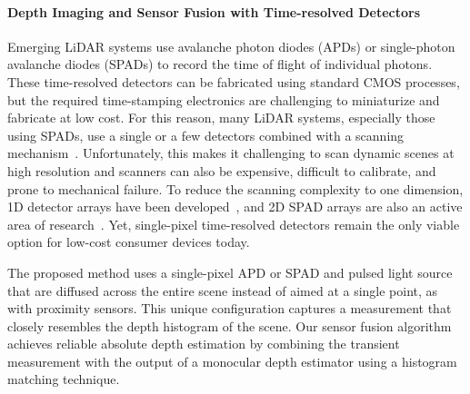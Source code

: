 \paragraph{Depth Imaging and Sensor Fusion with Time-resolved Detectors}
%
Emerging LiDAR systems use avalanche photon diodes (APDs) or single-photon avalanche diodes (SPADs)
to record the time of flight of individual photons. These time-resolved detectors can be
fabricated using standard CMOS processes, but the required time-stamping electronics are challenging to miniaturize and fabricate at low
cost. For this reason, many LiDAR systems, especially those using SPADs, use a single or a few detectors
combined with a  scanning
mechanism~\cite{Kirmani:2014,Lamb2010,Li:2019,pawlikowska2017single,gupta2019photonflooded}.
Unfortunately, this makes it challenging to scan dynamic scenes at high
resolution and scanners can also be expensive, difficult to calibrate, and prone
to mechanical failure. To reduce the scanning complexity to one dimension, 1D
detector arrays have been
developed~\cite{burri2017linospad,burri2016linospad,OToole2017}, and 2D SPAD arrays are also an active area of
research~\cite{Niclass2005,Stoppa2007,Veerappan2011,Zhang2018}. Yet,
single-pixel time-resolved detectors remain the only viable option for low-cost consumer devices
today.


The proposed method uses a single-pixel APD or SPAD and pulsed light source that are
diffused across the entire scene instead of aimed at a single point, as with
proximity sensors. This unique configuration captures a measurement that closely
resembles the depth histogram of the scene. Our sensor fusion algorithm achieves
reliable absolute depth estimation by combining the transient measurement with the
output of a monocular depth estimator using a histogram matching technique.

 


